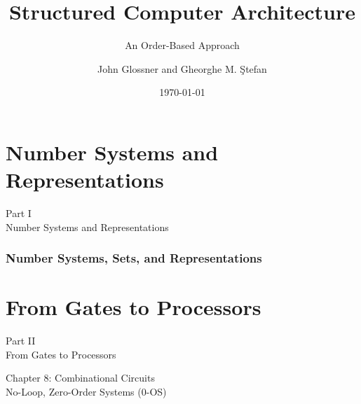\documentclass[aspectratio=169,11pt]{beamer}
\title[Part 1: Number Systems]{Structured Computer Architecture}
\subtitle{An Order-Based Approach}
\author{John Glossner and Gheorghe M. Ştefan}
\date{\today}
\begin{document}


\begin{frame}
\titlepage
\end{frame}

\part{Number Systems and Representations}

\begin{frame}
\begin{center}
{\Huge Part I}\\[0.5cm]
{\Large Number Systems and Representations}\\[0.5cm]
\end{center}
\end{frame}

\section{Number Systems, Sets, and Representations}


\part{From Gates to Processors}

\begin{frame}
\begin{center}
{\Huge Part II}\\[0.5cm]
{\Large From Gates to Processors}\\[0.5cm]
\end{center}
\end{frame}

\begin{frame}
\begin{center}
{\Huge Chapter 8: Combinational Circuits}\\[0.5cm]
{\Large No-Loop, Zero-Order Systems (0-OS)}\\[0.5cm]
\end{center}
\end{frame}
\end{document}

